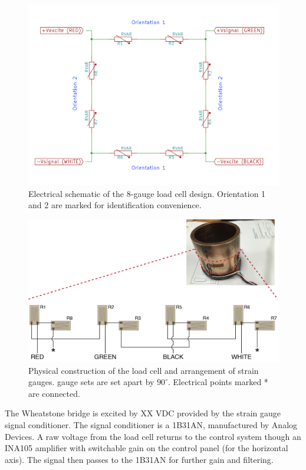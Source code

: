 \begin{figure}
	\centering
		\includegraphics[scale=0.3]{appendix_load_response/load_cell_schematic.png}
   	\caption{Electrical schematic of the 8-gauge load cell design. Orientation 1 and 2 are marked for identification convenience.}
  	\label{load_cell_schematic}
\end{figure}

\begin{figure}
	\centering
		\includegraphics[scale=0.6]{appendix_load_response/load_cell.png}
   	\caption{Physical construction of the load cell and arrangement of strain gauges. gauge sets are set apart by $90^\circ$. Electrical points marked * are connected.}
  	\label{load_cell_diagram}
\end{figure}

The Wheatstone bridge is excited by XX VDC provided by the strain gauge signal conditioner. The signal conditioner is a 1B31AN, manufactured by Analog Devices. A raw voltage from the load cell returns to the control system though an INA105 amplifier with switchable gain on the control panel (for the horizontal axis). The signal then passes to the 1B31AN for further gain and filtering.  

